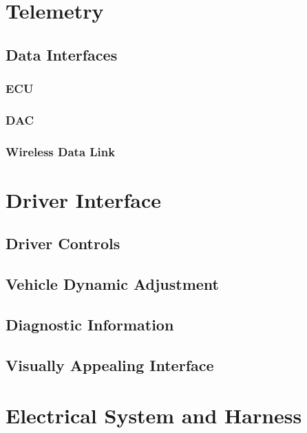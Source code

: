 \section{Telemetry}


\subsection{Data Interfaces}


\subsubsection{ECU }


\subsubsection{DAC }


\subsubsection{Wireless Data Link}


\section{Driver Interface}


\subsection{Driver Controls}


\subsection{Vehicle Dynamic Adjustment}


\subsection{Diagnostic Information}


\subsection{Visually Appealing Interface}


\section{Electrical System and Harness}




